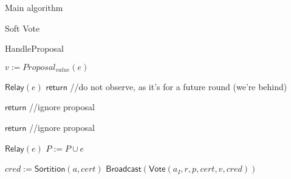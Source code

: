 \documentclass[10pt,a4paper]{article}
\begin{document}
\begin{section}{Main algorithm}
\begin{subsection}{Soft Vote}
\end{subsection}

\begin{subsection}{HandleProposal}\label{ssect:handle-proposal}

    \begin{algorithm}[H]
        \caption{\underline{HandleProposal}}
        \label{algo:handle-proposal}
        \begin{algorithmic}[1]

            \State $v := Proposal_{value}(e)$

                \State $\mathsf{Relay}(e)$  %
                \State $\mathsf{return}$  //do not observe, as it's for a future round (we're behind)
            \EndIf

                \State $\mathsf{return}$  //ignore proposal
            \EndIf

                \State $\mathsf{return}$ //ignore proposal
            \EndIf

            \State $\mathsf{Relay}(e)$
            \State $P := P \cup e$

                    \State $cred := 
                    \mathsf{Sortition}(a, cert)$
                        \State $\mathsf{Broadcast}(\mathsf{Vote}(a_I, r, p, cert, v,  cred))$
                    \EndIf
                \EndFor    
            \EndIf

        \EndFunction
        \end{algorithmic}
    \end{algorithm}
    

\end{subsection}
\end{section}
\end{document}
